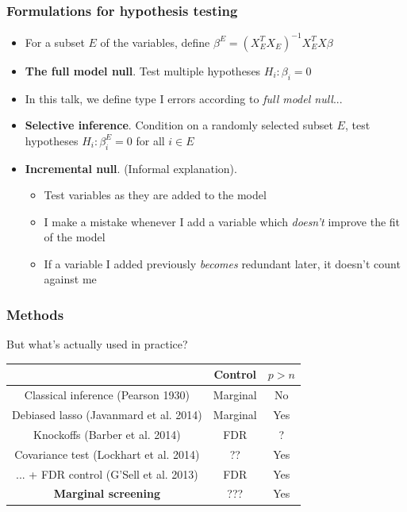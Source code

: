 \documentclass{beamer}
\begin{document}
\begin{frame}
\frametitle{Formulations for hypothesis testing}
\begin{itemize}
\item<1-5> For a subset $E$ of the variables, define $\beta^E = (X_E^T X_E)^{-1} X_E^T X\beta$
\item<2-> \textbf{The full model null}.  Test multiple hypotheses $H_i: \beta_i = 0$
\item<5> In this talk, we define type I errors according to \emph{full model
  null}... 
\item<3> \textbf{Selective inference}.  Condition on a randomly selected subset $E$, test hypotheses $H_i: \beta^E_i = 0$ for all $i \in E$
\item<4> \textbf{Incremental null}.  (Informal explanation).
\begin{itemize}
\item Test variables as they are added to the model
\item I make a mistake whenever I add a variable which \emph{doesn't} improve the fit of the model
\item If a variable I added previously \emph{becomes} redundant later, it doesn't count against me
\end{itemize}
\end{itemize}
\end{frame}


\begin{frame}
\frametitle{Methods}
But what's actually used in practice?
\begin{center}
\begin{tabular}{|c|c|c|} \hline
 & Control & $p > n$\\ \hline
Classical inference (Pearson 1930) & Marginal & No \\ \hline
Debiased lasso (Javanmard et al. 2014) & Marginal & Yes\\ \hline
Knockoffs (Barber et al. 2014) & FDR & ? \\ \hline
Covariance test (Lockhart et al. 2014) &  ?? & Yes \\
... + FDR control (G'Sell et al. 2013) &  FDR & Yes \\ \hline
\textbf{Marginal screening} & ??? & Yes \\ \hline
\end{tabular}
\end{center}
\end{frame}
\end{document}
